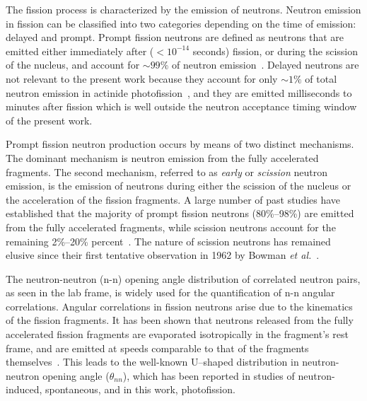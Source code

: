 The fission process is characterized by the emission of neutrons.
Neutron emission in fission can be classified into two categories depending on the time of emission: delayed and prompt.
Prompt fission neutrons are defined as neutrons that are emitted either immediately after ($<10^{-14}$ seconds) fission, or during the scission of the nucleus, and account for $\sim99\%$ of neutron emission~\cite{Caldwell2017DelayedNs}.
Delayed neutrons are not relevant to the present work because they account for only $\sim1\%$ of total neutron emission in actinide photofission~\cite{Caldwell2017DelayedNs}, and they are emitted milliseconds to minutes after fission which is well outside the neutron acceptance timing window of the present work.

Prompt fission neutron production occurs by means of two distinct mechanisms.
The dominant mechanism is neutron emission from the fully accelerated fragments.
The second mechanism, referred to as \textit{early} or \textit{scission} neutron emission, is the emission of neutrons during either the scission of the nucleus or the acceleration of the fission fragments.
A large number of past studies have established that the majority of prompt fission neutrons (80\%--98\%) are emitted from the fully accelerated fragments, while scission neutrons account for the remaining 2\%--20\% percent~\cite{Scission2005}.
The nature of scission neutrons has remained elusive since their first tentative observation in 1962 by Bowman \emph{et al.}~\cite{Bowman}.

The neutron-neutron (n-n) opening angle distribution of correlated neutron pairs, as seen in the lab frame, is widely used for the quantification of n-n angular correlations.
Angular correlations in fission neutrons arise due to the kinematics of the fission fragments.
It has been shown that neutrons released from the fully accelerated fission fragments are evaporated isotropically in the fragment's rest frame, and are emitted at speeds comparable to that of the fragments themselves~\cite{JORGENSEN}.
This leads to the well-known U--shaped distribution in neutron-neutron opening angle ($\theta_{nn}$), which has been reported in studies of neutron-induced, spontaneous, and in this work, photofission.

